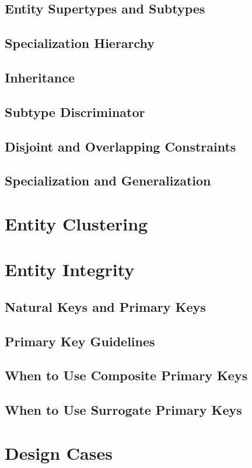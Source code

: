 \documentclass[a4paper, 12pt, titlepage]{report}
\begin{document}
{\subsection{Entity Supertypes and Subtypes}
\subsection{Specialization Hierarchy}
\subsection{Inheritance}
\subsection{Subtype Discriminator}
\subsection{Disjoint and Overlapping Constraints}
\subsection{Specialization and Generalization}

\section{Entity Clustering}
\section{Entity Integrity}
\subsection{Natural Keys and Primary Keys}
\subsection{Primary Key Guidelines}
\subsection{When to Use Composite Primary Keys}
\subsection{When to Use Surrogate Primary Keys}

\section{Design Cases}
}
\end{document}

